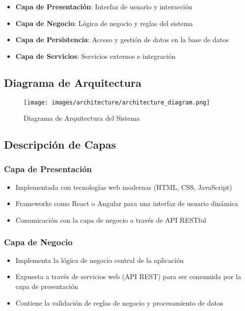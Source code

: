 \documentclass[12pt,a4paper]{article}
\begin{document}
\begin{itemize}
    \item \textbf{Capa de Presentación}: Interfaz de usuario y interacción
    \item \textbf{Capa de Negocio}: Lógica de negocio y reglas del sistema
    \item \textbf{Capa de Persistencia}: Acceso y gestión de datos en la base de datos
    \item \textbf{Capa de Servicios}: Servicios externos e integración
\end{itemize}

\subsection{Diagrama de Arquitectura}

\begin{figure}[H]
    \centering
    \texttt{[image: images/architecture/architecture\_diagram.png]}
    \caption{Diagrama de Arquitectura del Sistema}
    \label{fig:diagrama_arquitectura}
\end{figure}

\subsection{Descripción de Capas}

\subsubsection{Capa de Presentación}

\begin{itemize}
    \item Implementada con tecnologías web modernas (HTML, CSS, JavaScript)
    \item Frameworks como React o Angular para una interfaz de usuario dinámica
    \item Comunicación con la capa de negocio a través de API RESTful
\end{itemize}

\subsubsection{Capa de Negocio}

\begin{itemize}
    \item Implementa la lógica de negocio central de la aplicación
    \item Expuesta a través de servicios web (API REST) para ser consumida por la capa de presentación
    \item Contiene la validación de reglas de negocio y procesamiento de datos
\end{itemize}
\end{document}

